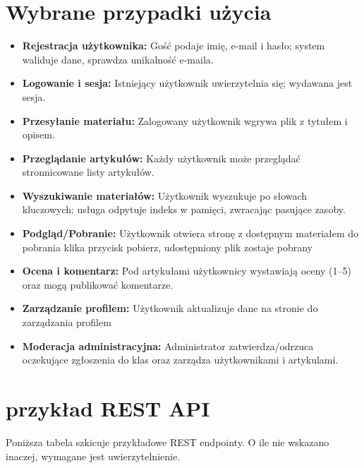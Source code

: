 \section*{Wybrane przypadki użycia}
\begin{itemize}
  \item \textbf{Rejestracja użytkownika:} Gość podaje imię, e-mail i hasło; system waliduje dane, sprawdza unikalność e-maila.
  \item \textbf{Logowanie i sesja:} Istniejący użytkownik uwierzytelnia się; wydawana jest sesja.
  \item \textbf{Przesyłanie materiału:} Zalogowany użytkownik wgrywa plik z tytułem i opisem.
  \item \textbf{Przeglądanie artykułów:} Każdy użytkownik może przeglądać stronnicowane listy artykułów.
  \item \textbf{Wyszukiwanie materiałów:} Użytkownik wyszukuje po słowach kluczowych; usługa odpytuje indeks w pamięci, zwracając pasujące zasoby.
  \item \textbf{Podgląd/Pobranie:} Użytkownik otwiera stronę z dostępnym materiałem do pobrania klika przycisk pobierz, udostępniony plik zostaje pobrany
  \item \textbf{Ocena i komentarz:} Pod artykułami użytkownicy wystawiają oceny (1--5) oraz mogą publikować komentarze.
  \item \textbf{Zarządzanie profilem:} Użytkownik aktualizuje dane na stronie do zarządzania profilem
  \item \textbf{Moderacja administracyjna:} Administrator zatwierdza/odrzuca oczekujące zgłoszenia do klas oraz zarządza użytkownikami i artykulami.
\end{itemize}

\section*{przykład REST API}
\noindent Poniższa tabela szkicuje przykładowe REST endpointy. O ile nie wskazano inaczej, wymagane jest uwierzytelnienie.

